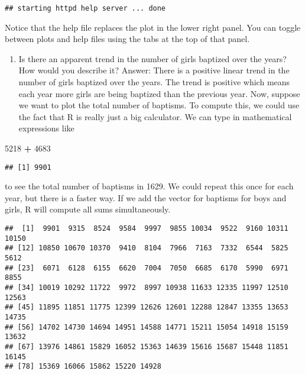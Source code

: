 \documentclass[]{article}
\newenvironment{Shaded}{\begin{snugshade}}{\end{snugshade}}
\newcommand{\DecValTok}[1]{\textcolor[rgb]{0.00,0.00,0.81}{#1}}
\newcommand{\StringTok}[1]{\textcolor[rgb]{0.31,0.60,0.02}{#1}}
\newcommand{\OperatorTok}[1]{\textcolor[rgb]{0.81,0.36,0.00}{\textbf{#1}}}
\newcommand{\NormalTok}[1]{#1}
\providecommand{\tightlist}{%
  \setlength{\itemsep}{0pt}\setlength{\parskip}{0pt}}
\begin{document}
\begin{verbatim}
## starting httpd help server ... done
\end{verbatim}

Notice that the help file replaces the plot in the lower right panel.
You can toggle between plots and help files using the tabs at the top of
that panel.

\begin{enumerate}
\def\labelenumi{\arabic{enumi}.}
\setcounter{enumi}{1}
\tightlist
\item
  Is there an apparent trend in the number of girls baptized over the
  years?\\
  How would you describe it? Answer: There is a positive linear trend in
  the number of girls baptized over the years. The trend is positive
  which means each year more girls are being baptized than the previous
  year. Now, suppose we want to plot the total number of baptisms. To
  compute this, we could use the fact that R is really just a big
  calculator. We can type in mathematical expressions like
\end{enumerate}

\begin{Shaded}
\begin{Highlighting}[]
\DecValTok{5218} \OperatorTok{+}\StringTok{ }\DecValTok{4683}
\end{Highlighting}
\end{Shaded}

\begin{verbatim}
## [1] 9901
\end{verbatim}

to see the total number of baptisms in 1629. We could repeat this once
for each year, but there is a faster way. If we add the vector for
baptisms for boys and girls, R will compute all sums simultaneously.

\begin{Shaded}
\end{Shaded}

\begin{verbatim}
##  [1]  9901  9315  8524  9584  9997  9855 10034  9522  9160 10311 10150
## [12] 10850 10670 10370  9410  8104  7966  7163  7332  6544  5825  5612
## [23]  6071  6128  6155  6620  7004  7050  6685  6170  5990  6971  8855
## [34] 10019 10292 11722  9972  8997 10938 11633 12335 11997 12510 12563
## [45] 11895 11851 11775 12399 12626 12601 12288 12847 13355 13653 14735
## [56] 14702 14730 14694 14951 14588 14771 15211 15054 14918 15159 13632
## [67] 13976 14861 15829 16052 15363 14639 15616 15687 15448 11851 16145
## [78] 15369 16066 15862 15220 14928
\end{verbatim}
\end{document}
